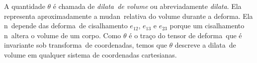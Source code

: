 A quantidade $\theta$ \'e chamada de {\it dilata\cao\ de
volume} ou abreviadamente {\it dilata\cao}. Ela representa
aproximadamente a mudan\ca\ relativa do volume durante a
deforma\cao. Ela n\ao\ depende das deforma\coes\ de cisalhamento
$e_{12}$, $e_{13}$ e $e_{23}$ porque um cisalhamento n\ao\ altera o
volume de um corpo. Como $\theta$ \'e o tra\c co do tensor de
deforma\cao\ que \'e invariante sob transforma\cao\ de
coordenadas, temos que $\theta$ descreve a dilata\cao\ 
de volume em qualquer sistema de coordenadas cartesianas.



